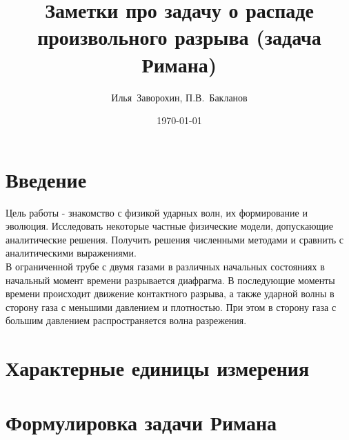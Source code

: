 \documentclass[a4paper,12pt]{extarticle}
\begin{document}
\title{\large
 Заметки про задачу о распаде произвольного разрыва (задача Римана)
}

\author{Илья~Заворохин, П.В.~Бакланов}

\date{\today}

\maketitle

\tableofcontents






\section{Введение}

Цель работы - знакомство с физикой ударных волн, их формирование и эволюция.
Исследовать некоторые частные физические модели, допускающие аналитические решения. 
Получить решения численными методами и сравнить с аналитическими выражениями. 
\\

В ограниченной трубе с двумя газами в различных начальных состояниях в начальный момент времени разрывается диафрагма. В последующие моменты времени происходит движение контактного разрыва, а также ударной волны в сторону газа с меньшими давлением и плотностью. При этом в сторону газа с большим давлением распространяется волна разрежения.


\section{Характерные единицы измерения}


\section{Формулировка задачи Римана}
\end{document}

